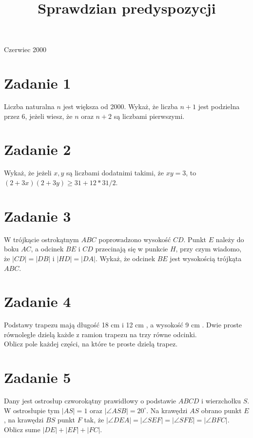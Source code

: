 \documentclass[10pt]{article}
\title{Sprawdzian predyspozycji }
\author{}
\date{}
\begin{document}
\maketitle
Czerwiec 2000

\section*{Zadanie 1}
Liczba naturalna \(n\) jest większa od 2000. Wykaż, że liczba \(n+1\) jest podzielna przez 6, jeżeli wiesz, że \(n\) oraz \(n+2\) są liczbami pierwszymi.

\section*{Zadanie 2}
Wykaż, że jeżeli \(x, y\) są liczbami dodatnimi takimi, że \(x y=3\), to \((2+3 x)(2+3 y) \geq 31+12 * 31 / 2\).

\section*{Zadanie 3}
W trójkącie ostrokątnym \(A B C\) poprowadzono wysokość \(C D\). Punkt \(E\) należy do boku \(A C\), a odcinek \(B E\) i \(C D\) przecinają się w punkcie \(H\), przy czym wiadomo, że \(|C D|=|D B|\) i \(|H D|=|D A|\). Wykaż, że odcinek \(B E\) jest wysokością trójkąta \(A B C\).

\section*{Zadanie 4}
Podstawy trapezu mają długość 18 cm i 12 cm , a wysokość 9 cm . Dwie proste równoległe dzielą każde z ramion trapezu na trzy równe odcinki.\\
Oblicz pole każdej części, na które te proste dzielą trapez.

\section*{Zadanie 5}
Dany jest ostrosłup czworokątny prawidłowy o podstawie \(A B C D\) i wierzchołku \(S\). W ostrosłupie tym \(|A S|=1\) oraz \(|\angle A S B|=20^{\circ}\). Na krawędzi \(A S\) obrano punkt \(E\), na krawędzi \(B S\) punkt \(F\) tak, że \(|\angle D E A|=|\angle S E F|=|\angle S F E|=|\angle B F C|\).\\
Oblicz sume \(|D E|+|E F|+|F C|\).
\end{document}

